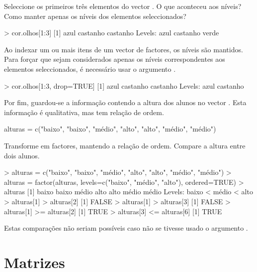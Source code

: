 \documentclass{exam}
\begin{document}
\begin{questions}
\question Seleccione os primeiros três elementos do vector . O que aconteceu aos níveis? Como manter apenas os níveis dos elementos seleccionados?

\begin{solution}
	\begin{rcode}
		> cor.olhos[1:3]
		[1] azul     castanho castanho
		Levels: azul castanho verde
	\end{rcode}
	Ao indexar um ou mais itens de um vector de factores, os níveis são mantidos. Para forçar que sejam considerados apenas os níveis correspondentes aos elementos seleccionados, é necessário usar o argumento .
	\begin{rcode}
		> cor.olhos[1:3, drop=TRUE]
		[1] azul     castanho castanho
		Levels: azul castanho
	\end{rcode}
\end{solution}

\question Por fim, guardou-se a informação contendo a altura dos alunos no vector . Esta informação é qualitativa, mas tem relação de ordem.
\begin{rcode}
	alturas = c("baixo", "baixo", "médio", "alto", "alto", "médio", "médio")
\end{rcode}
Transforme em factores, mantendo a relação de ordem. Compare a altura entre dois alunos.

\begin{solution}
	\begin{rcode}
		> alturas = c("baixo", "baixo", "médio", "alto", "alto", "médio", "médio")
		> alturas = factor(alturas, levels=c("baixo", "médio", "alto"), ordered=TRUE)
		> alturas
		[1] baixo baixo médio alto  alto  médio médio
		Levels: baixo < médio < alto
		> alturas[1] > alturas[2]
		[1] FALSE
		> alturas[1] > alturas[3]
		[1] FALSE
		> alturas[1] >= alturas[2]
		[1] TRUE
		> alturas[3] <= alturas[6]
		[1] TRUE
	\end{rcode}
	Estas comparações não seriam possíveis caso não se tivesse usado o argumento .
\end{solution}

\end{questions}

\section{Matrizes}
\label{matrizes}
\end{document}
